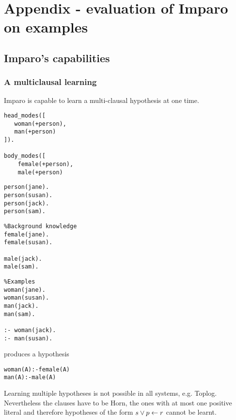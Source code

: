 \chapter{Appendix - evaluation of Imparo on examples}

\section{Imparo's capabilities}
\subsection{A multiclausal learning}
Imparo is capable to learn a multi-clausal hypothesis at one time.

\begin{minipage}[t]{.25\textwidth}
\begin{lstlisting}
head_modes([
   woman(+person),
   man(+person)
]).

body_modes([
    female(+person),
    male(+person)
\end{lstlisting}
\end{minipage}
\begin{minipage}[t]{.20\textwidth}
\begin{lstlisting}
person(jane).
person(susan).
person(jack).
person(sam).\end{lstlisting}
\end{minipage}
\begin{minipage}[t]{.30\textwidth}
\begin{lstlisting}
%Background knowledge
female(jane).
female(susan).

male(jack).
male(sam).
\end{lstlisting}
\end{minipage}
\begin{minipage}[t]{.25\textwidth}
\begin{lstlisting}
%Examples
woman(jane).
woman(susan).
man(jack).
man(sam).

:- woman(jack).
:- man(susan).
\end{lstlisting}
\end{minipage}


produces a hypothesis
\begin{lstlisting}
woman(A):-female(A)
man(A):-male(A)
\end{lstlisting}

Learning multiple hypotheses is not possible in all systems, e.g. Toplog. Nevertheless the clauses have to be Horn, the ones with at most one positive literal and therefore hypotheses of the form $s \vee p \leftarrow r$ cannot be learnt.

